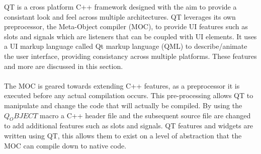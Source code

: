   QT is a cross platform C++ framework designed with the aim to provide a consistant look and feel across multiple architectures. QT leverages its own preprocessor, the Meta-Object compiler (MOC), to provide UI features such as slots and signals which are listeners that can be coupled with UI elements. It uses a UI markup language called Qt markup language (QML) to describe/animate the user interface, providing consistancy across multiple platforms. These features and more are discussed in this section.\\\\
  The MOC is geared towards extending C++ features, as a preprocessor it is executed before any actual compilation occurs. This pre-processing allows QT to manipulate and change the code that will actually be compiled. By using the $Q_OBJECT$ macro a C++ header file and the subsequent source file are changed to add additional features such as slots and signals. QT features and widgets are written using QT, this allows them to exist on a level of abstraction that the MOC can compile down to native code.

  \sssctn{}
  \sssctn{}



